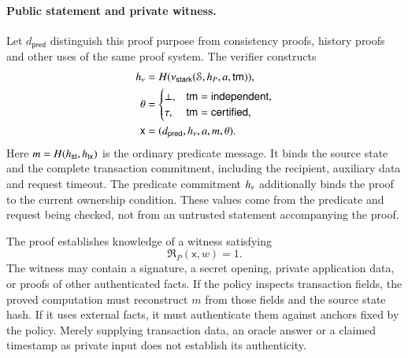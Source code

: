 \paragraph{Public statement and private witness.}
Let $d_\mathsf{pred}$ distinguish this proof purpose from consistency proofs, history proofs and other uses of the same proof system. The verifier constructs
\[
\begin{aligned}
h_\nu & = H(\nu_\mathsf{stark}(\mathcal{S},h_P,a,\mathsf{tm})),\\
\theta & = \begin{cases}
  \bot, & \mathsf{tm}=\mathsf{independent},\\
  \tau, & \mathsf{tm}=\mathsf{certified},
\end{cases}\\
\mathsf{x} & = (d_\mathsf{pred},h_\nu,a,m,\theta).
\end{aligned}
\]
Here $m=H({h_\mathsf{st}},{h_\mathsf{tx}})$ is the ordinary predicate message. It binds the source state and the complete transaction commitment, including the recipient, auxiliary data and request timeout. The predicate commitment $h_\nu$ additionally binds the proof to the current ownership condition. These values come from the predicate and request being checked, not from an untrusted statement accompanying the proof.

The proof establishes knowledge of a witness satisfying
\[
\mathfrak{R}_P(\mathsf{x},w)=1.
\]
The witness may contain a signature, a secret opening, private application data, or proofs of other authenticated facts. If the policy inspects transaction fields, the proved computation must reconstruct $m$ from those fields and the source state hash. If it uses external facts, it must authenticate them against anchors fixed by the policy. Merely supplying transaction data, an oracle answer or a claimed timestamp as private input does not establish its authenticity.

